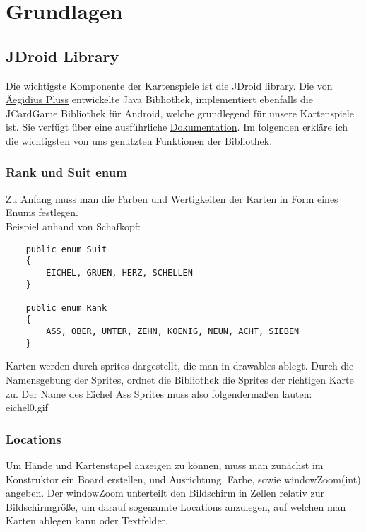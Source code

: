 \chapter{Grundlagen}

\section{JDroid Library}
Die wichtigste Komponente der Kartenspiele ist die JDroid library.
Die von \textcolor{blue}{\href{http://www.aplu.ch/home/apluhomex.jsp?site=99}{Äegidius Plüss}} entwickelte Java Bibliothek, implementiert ebenfalls die JCardGame Bibliothek für Android, welche grundlegend für unsere Kartenspiele ist. Sie verfügt über eine ausführliche \textcolor{blue}{\href{http://www.java-online.ch/gamegrid/index.php?inhalt_links=navigation.inc.php&inhalt_mitte=iframedoc1.html}{Dokumentation}}. Im folgenden erkläre ich die wichtigsten von uns genutzten Funktionen der Bibliothek.

\subsection{Rank und Suit enum}
Zu Anfang muss man die Farben und Wertigkeiten der Karten in Form eines Enums festlegen.\\

Beispiel anhand von Schafkopf:\\

\begin{lstlisting}
    public enum Suit
    {
        EICHEL, GRUEN, HERZ, SCHELLEN
    }

    public enum Rank
    {
        ASS, OBER, UNTER, ZEHN, KOENIG, NEUN, ACHT, SIEBEN
    }
\end{lstlisting}

Karten werden durch sprites dargestellt, die man in drawables ablegt. Durch die Namensgebung der Sprites, ordnet die Bibliothek die Sprites der richtigen Karte zu.
Der Name des Eichel Ass Sprites muss also folgendermaßen lauten:\\
eichel0.gif\\

\subsection{Locations}
Um Hände und Kartenstapel anzeigen zu können, muss man zunächst im Konstruktor ein Board erstellen, und Ausrichtung, Farbe, sowie windowZoom(int) angeben. Der windowZoom unterteilt den Bildschirm in Zellen relativ zur Bildschirmgröße, um darauf sogenannte Locations anzulegen, auf welchen man Karten ablegen kann oder Textfelder.\\

